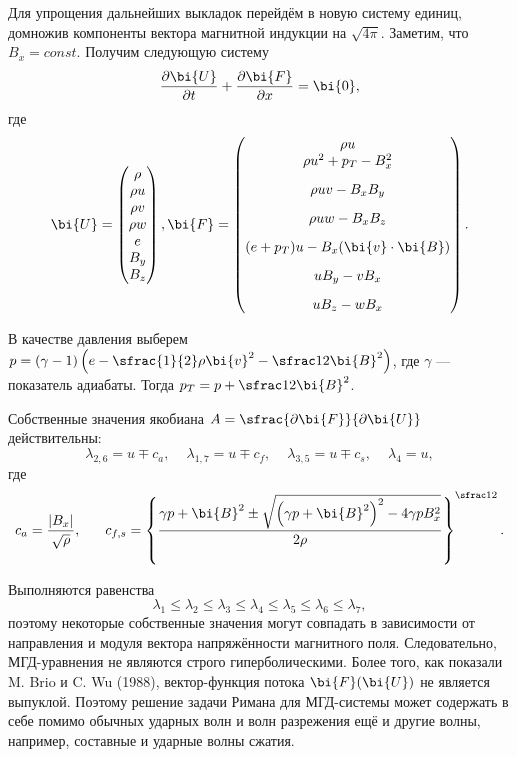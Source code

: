 \documentclass[12pt, a4paper]{article}
\begin{document}
	Для упрощения дальнейших выкладок перейдём в новую систему единиц, домножив компоненты вектора магнитной индукции на $\sqrt{4\pi}$. Заметим, что $B_x = const$. Получим следующую систему
 	\begin{equation}
 		\label{vectorMHD-2}
 		\dfrac{\partial \bi{U}}{\partial t} + \dfrac{\partial \bi{F}}{\partial x} = \bi{0},
 	\end{equation}
 	где 
 	\[
 	\bi{U} = \begin{pmatrix}\rho \\ \rho u \\ \rho v \\ \rho w \\ e \\ B_y \\ B_z \end{pmatrix},
 	\bi{F}=\begin{pmatrix} \rho u \\ 
 		\rho u^2 + p_T - B_x^2\\[3mm] 
 		\rho uv - B_x B_y \\[3mm] 
 		\rho uw - B_x B_z \\[3mm]
 		(e+p_T)u - B_x  (\bi{v}\cdot\bi{B}) \\[3mm]
 		uB_y - vB_x \\[3mm]
 		uB_z - wB_x  
 	\end{pmatrix}.
 	\]
 	
 	В качестве давления выберем $p=(\gamma-1)\left(e - \sfrac{1}{2}\rho\bi{v}^2 - \sfrac12 \bi{B}^2\right)$, где $\gamma$ --- показатель адиабаты. Тогда $p_T = p + \sfrac12 \bi{B}^2$.
 	
 	Собственные значения якобиана $A = \sfrac{\partial \bi{F}}{\partial \bi{U}}$ действительны:
 	\[
 	\lambda_{2,6} = u \mp c_a, \phantom{xx}\lambda_{1,7} = u \mp c_f,\phantom{xx} \lambda_{3,5} = u \mp c_s,\phantom{xx} \lambda_{4} = u,    
 	\]
 	где 
 	\[
 	c_a = \dfrac{|B_x|}{\sqrt{\rho}}, \phantom{xxx} c_{f,s} = \left\{
 			\dfrac{\gamma p + \bi{B}^2 \pm \sqrt{\left(\gamma p + \bi{B}^2\right)^2 - 4\gamma p B_x^2}}{2\rho}\right\}^{\sfrac12}.
 	\]
 	
 	Выполняются равенства
 	\[
 	\lambda_1 \le \lambda_2 \le \lambda_3 \le \lambda_4 \le \lambda_5 \le \lambda_6 \le \lambda_7,
 	\]
 	поэтому некоторые собственные значения могут совпадать в зависимости от направления и модуля вектора напряжённости магнитного поля.  Следовательно, МГД-уравнения не являются строго гиперболическими. Более того, как показали M. Brio и C. Wu (1988), вектор-функция потока $\bi{F}(\bi{U})$ не является выпуклой. Поэтому решение задачи Римана для МГД-системы может содержать в себе помимо обычных ударных волн и волн разрежения ещё и другие волны, например, составные и ударные волны сжатия.
 	
\end{document}
